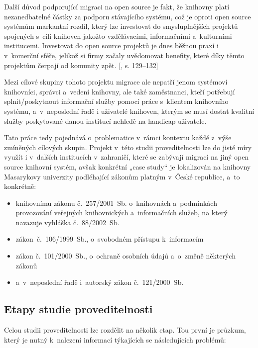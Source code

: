 \documentclass[
	11pt, oneside, printed, final, palatino
	microtype,
	table,   %
	lof,     %
	lot     %
]{fithesis3}
\newcommand{\citepages}[2]{[\cite{#2}, s. #1]}
\begin{document}
{Další důvod podporující migraci na open source je fakt, že knihovny platí nezanedbatelné částky za podporu stávajícího systému, což je oproti open source systémům markantní rozdíl, který lze investovat do smysluplnějších projektů spojených s~cíli knihoven jakožto vzdělávacími, informačními a~kulturními institucemi. Investovat do open source projektů je dnes běžnou praxí i v~komerční sféře, jelikož si firmy začaly uvědomovat benefity, které díky těmto projektům čerpají od komunity zpět. \citepages{129–132}{Fogel2012}

Mezi cílové skupiny tohoto projektu migrace ale nepatří jenom systémoví knihovníci, správci a~vedení knihovny, ale také zaměstnanci, kteří potřebují splnit/poskytnout informační služby pomocí práce s~klientem knihovního systému, a~v~neposlední řadě i uživatelé knihoven, kterým se musí dostat kvalitní služby poskytované danou institucí nehledě na handicap uživatele.

Tato práce tedy pojednává o~problematice v~rámci kontextu každé z~výše zmíněných cílových skupin. Projekt v~této studii proveditelnosti lze do jisté míry využít i v~dalších institucích v~zahraničí, které se zabývají migrací na jiný open source knihovní systém, avšak konkrétní „case study“ je lokalizován na knihovny Masarykovy univerzity podléhající zákonům platným v~České republice, a~to konkrétně:

\begin{itemize}
\item knihovnímu zákonu č.~257/2001~Sb. o~knihovnách a~podmínkách provozování veřejných knihovnických a~informačních služeb, na který navazuje vyhláška č.~88/2002~Sb.
\item zákon~č.~106/1999~Sb., o~svobodném přístupu k~informacím
\item zákon č.~101/2000~Sb., o~ochraně osobních údajů a~o~změně některých zákonů
\item a~v~neposlední řadě i~autorský zákon č.~121/2000~Sb.
\end{itemize}

\subsection{Etapy studie proveditelnosti}

Celou studii proveditelnosti lze rozdělit na několik etap. Tou první je průzkum, který je nutný k~nalezení informací týkajících se následujících problémů:

}
\end{document}
